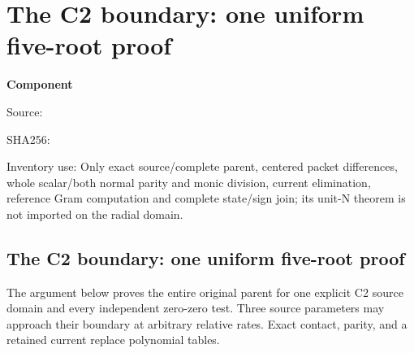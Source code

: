 \chapter{The C2 boundary: one uniform five-root proof}
\label{component:p9f1235511111}
\noindent\textbf{Component }\par
{\small\noindent Source: \par}
{\small\noindent SHA256: \par}
{\small\noindent Inventory use: Only exact source/complete parent, centered packet differences, whole scalar/both normal parity and monic division, current elimination, reference Gram computation and complete state/sign join; its unit-N theorem is not imported on the radial domain.\par}
\medskip
\section{The C2 boundary: one uniform five-root proof}
\label{p9f1235511111:sec:c2-unified}

The argument below proves the entire original parent for one explicit
C2 source domain and every independent zero-zero test.  Three source
parameters may approach their boundary at arbitrary relative rates.
Exact contact, parity, and a retained current replace polynomial tables.

